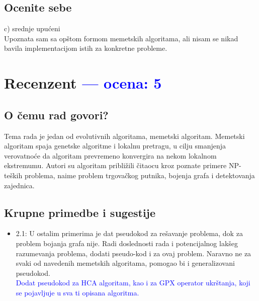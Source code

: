 \documentclass[a4paper]{report}
\newcommand{\odgovor}[1]{\textcolor{blue}{#1}}
\begin{document}
\section{Ocenite sebe}
 c) srednje upućeni \\
 Upoznata sam sa opštom formom memetskih algoritama, ali nisam se nikad bavila implementacijom istih za konkretne probleme.


\chapter{Recenzent \odgovor{--- ocena: 5} }


\section{O čemu rad govori?}
Tema rada je jedan od evolutivnih algoritama, memetski algoritam. Memetski algoritam spaja genetske algoritme i lokalnu pretragu, u cilju smanjenja verovatnoće da algoritam prevremeno konvergira na nekom lokalnom ekstremumu.  Autori su algoritam približili čitaocu kroz poznate primere NP-teških problema, naime problem trgovačkog putnika, bojenja grafa i detektovanja zajednica.

\section{Krupne primedbe i sugestije}
\begin{itemize}
    \item 2.1: U ostalim primerima je dat pseudokod za rešavanje problema, dok za problem bojanja grafa nije. Radi doslednosti rada i potencijalnog lakšeg razumevanja problema, dodati pseudo-kod i za ovaj problem. Naravno ne za svaki od navedenih memetskih algoritama, pomogao bi i generalizovani pseudokod.\\
  \odgovor{Dodat pseudokod za HCA algoritam, kao i za GPX operator ukrštanja, koji se pojavljuje u sva ti opisana algoritma.}
\end{itemize}
\end{document}
